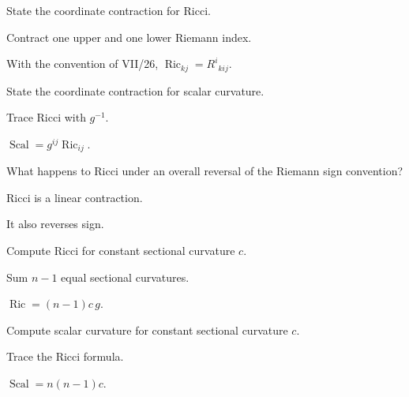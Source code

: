 \begin{exercise}\label{exr:vii27-08}
State the coordinate contraction for Ricci.
\end{exercise}
\begin{hint}
Contract one upper and one lower Riemann index.
\end{hint}
\begin{solution}
With the convention of VII/26, \(\operatorname{Ric}_{kj}=R^i{}_{kij}\).
\end{solution}

\begin{exercise}\label{exr:vii27-09}
State the coordinate contraction for scalar curvature.
\end{exercise}
\begin{hint}
Trace Ricci with \(g^{-1}\).
\end{hint}
\begin{solution}
\(\operatorname{Scal}=g^{ij}\operatorname{Ric}_{ij}\).
\end{solution}

\begin{exercise}\label{exr:vii27-10}
What happens to Ricci under an overall reversal of the Riemann sign convention?
\end{exercise}
\begin{hint}
Ricci is a linear contraction.
\end{hint}
\begin{solution}
It also reverses sign.
\end{solution}

\begin{exercise}\label{exr:vii27-11}
Compute Ricci for constant sectional curvature \(c\).
\end{exercise}
\begin{hint}
Sum \(n-1\) equal sectional curvatures.
\end{hint}
\begin{solution}
\(\operatorname{Ric}=(n-1)c\,g\).
\end{solution}

\begin{exercise}\label{exr:vii27-12}
Compute scalar curvature for constant sectional curvature \(c\).
\end{exercise}
\begin{hint}
Trace the Ricci formula.
\end{hint}
\begin{solution}
\(\operatorname{Scal}=n(n-1)c\).
\end{solution}

